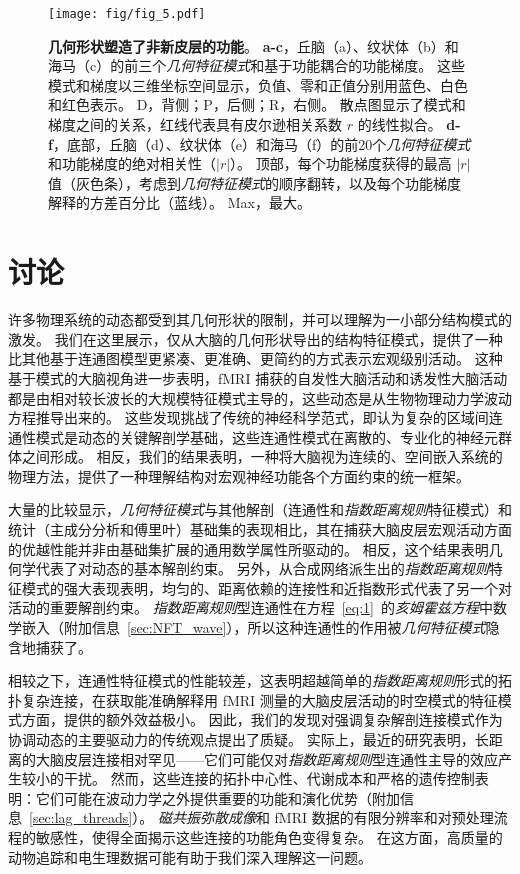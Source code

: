 \documentclass[lang=cn,a4paper,newtx,citestyle=gb7714-2015, bibstyle=gb7714-2015]{elegantpaper}
\begin{document}
\begin{figure}[!htb]
	\centering
	\texttt{[image: fig/fig\_5.pdf]}
	\caption{\textbf{几何形状塑造了非新皮层的功能}。
		\textbf{a-c}，丘脑（a）、纹状体（b）和海马（c）的前三个\textit{几何特征模式}和基于功能耦合的功能梯度。
		这些模式和梯度以三维坐标空间显示，负值、零和正值分别用蓝色、白色和红色表示。
		D，背侧；P，后侧；R，右侧。
		散点图显示了模式和梯度之间的关系，红线代表具有皮尔逊相关系数 $ r $ 的线性拟合。
		\textbf{d-f}，底部，丘脑（d）、纹状体（e）和海马（f）的前20个\textit{几何特征模式}和功能梯度的绝对相关性（$ |r| $）。
		顶部，每个功能梯度获得的最高 $ |r| $ 值（灰色条），考虑到\textit{几何特征模式}的顺序翻转，以及每个功能梯度解释的方差百分比（蓝线）。
		Max，最大。
	} \label{fig:5}
\end{figure}



\section{讨论}

许多物理系统的动态都受到其几何形状的限制，并可以理解为一小部分结构模式的激发。
我们在这里展示，仅从大脑的几何形状导出的结构特征模式，提供了一种比其他基于连通图模型更紧凑、更准确、更简约的方式表示宏观级别活动。
这种基于模式的大脑视角进一步表明，fMRI 捕获的自发性大脑活动和诱发性大脑活动都是由相对较长波长的大规模特征模式主导的，这些动态是从生物物理动力学波动方程推导出来的。
这些发现挑战了传统的神经科学范式，即认为复杂的区域间连通性模式是动态的关键解剖学基础，这些连通性模式在离散的、专业化的神经元群体之间形成。
相反，我们的结果表明，一种将大脑视为连续的、空间嵌入系统的物理方法，提供了一种理解结构对宏观神经功能各个方面约束的统一框架。


大量的比较显示，\textit{几何特征模式}与其他解剖（连通性和\textit{指数距离规则}特征模式）和统计（主成分分析和傅里叶）基础集的表现相比，其在捕获大脑皮层宏观活动方面的优越性能并非由基础集扩展的通用数学属性所驱动的。
相反，这个结果表明几何学代表了对动态的基本解剖约束。
另外，从合成网络派生出的\textit{指数距离规则}特征模式的强大表现表明，均匀的、距离依赖的连接性和近指数形式代表了另一个对活动的重要解剖约束。
\textit{指数距离规则}型连通性在方程~\ref{eq:1}~的\textit{亥姆霍兹方程}中数学嵌入（附加信息~\ref{sec:NFT_wave}），所以这种连通性的作用被\textit{几何特征模式}隐含地捕获了。


相较之下，连通性特征模式的性能较差，这表明超越简单的\textit{指数距离规则}形式的拓扑复杂连接，在获取能准确解释用 fMRI 测量的大脑皮层活动的时空模式的特征模式方面，提供的额外效益极小。
因此，我们的发现对强调复杂解剖连接模式作为协调动态的主要驱动力的传统观点提出了质疑。
实际上，最近的研究表明，长距离的大脑皮层连接相对罕见——它们可能仅对\textit{指数距离规则}型连通性主导的效应产生较小的干扰。
然而，这些连接的拓扑中心性、代谢成本和严格的遗传控制表明：它们可能在波动力学之外提供重要的功能和演化优势（附加信息~\ref{sec:lag_threads}）。
\textit{磁共振弥散成像}和 fMRI 数据的有限分辨率和对预处理流程的敏感性，使得全面揭示这些连接的功能角色变得复杂。
在这方面，高质量的动物追踪和电生理数据可能有助于我们深入理解这一问题。
\end{document}
